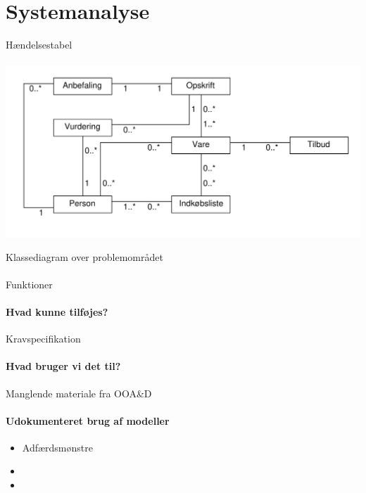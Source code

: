 \section{Systemanalyse}
\begin{frame}{Hændelsestabel}
	\framesubtitle{}
	\includegraphics[width=1\textwidth]{images/klassediagram_model_simple.pdf}
\end{frame}
\begin{frame}{Klassediagram over problemområdet}
	\framesubtitle{}
	
\end{frame}
\begin{frame}{Funktioner}
	\framesubtitle{Hvad kunne tilføjes?}
	
\end{frame}
\begin{frame}{Kravspecifikation}
	\framesubtitle{Hvad bruger vi det til?}
\end{frame}
\begin{frame}{Manglende materiale fra OOA\&D}
	\framesubtitle{Udokumenteret brug af modeller}
	\begin{itemize} 
    \item Adfærdsmønstre
    \item 
    \item 
  \end{itemize}
\end{frame}